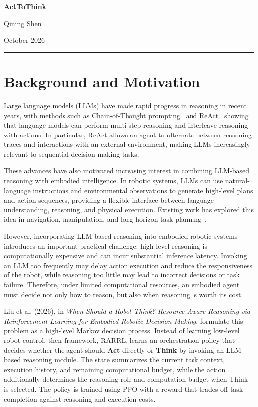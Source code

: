 \documentclass[11pt]{article}
\begin{document}
\begin{center}
    {\LARGE\bfseries ActToThink\par}
    \vspace{0.35em}
    {\large Qining Shen\par}
    \vspace{0.15em}
    {\small October 2026\par}
\end{center}

\vspace{0.5em}
\hrule
\vspace{0.9em}

\section{Background and Motivation}

Large language models (LLMs) have made rapid progress in reasoning in recent years, with methods such as Chain-of-Thought prompting~\cite{wei2022cot} and ReAct~\cite{yao2023react} showing that language models can perform multi-step reasoning and interleave reasoning with actions. In particular, ReAct allows an agent to alternate between reasoning traces and interactions with an external environment, making LLMs increasingly relevant to sequential decision-making tasks.

These advances have also motivated increasing interest in combining LLM-based reasoning with embodied intelligence. In robotic systems, LLMs can use natural-language instructions and environmental observations to generate high-level plans and action sequences, providing a flexible interface between language understanding, reasoning, and physical execution. Existing work has explored this idea in navigation, manipulation, and long-horizon task planning~\cite{wang2024robotics}.

However, incorporating LLM-based reasoning into embodied robotic systems introduces an important practical challenge: high-level reasoning is computationally expensive and can incur substantial inference latency. Invoking an LLM too frequently may delay action execution and reduce the responsiveness of the robot, while reasoning too little may lead to incorrect decisions or task failure. Therefore, under limited computational resources, an embodied agent must decide not only how to reason, but also when reasoning is worth its cost.

Liu et al. (2026), in \textit{When Should a Robot Think? Resource-Aware Reasoning via Reinforcement Learning for Embodied Robotic Decision-Making}, formulate this problem as a high-level Markov decision process. Instead of learning low-level robot control, their framework, RARRL, learns an orchestration policy that decides whether the agent should \textbf{Act} directly or \textbf{Think} by invoking an LLM-based reasoning module. The state summarizes the current task context, execution history, and remaining computational budget, while the action additionally determines the reasoning role and computation budget when Think is selected. The policy is trained using PPO with a reward that trades off task completion against reasoning and execution costs.
\end{document}
